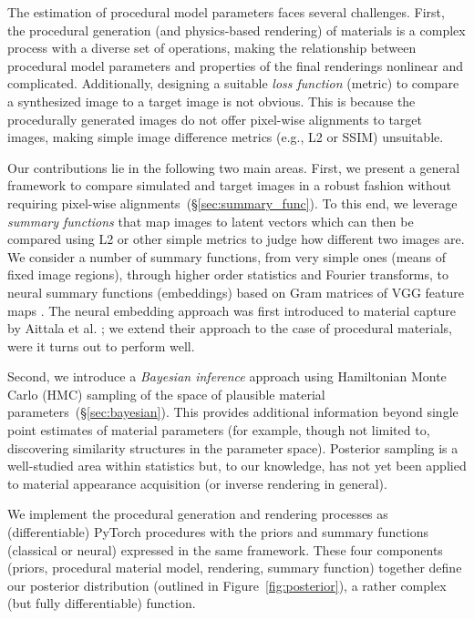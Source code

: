 The estimation of procedural model parameters faces several challenges. First, the procedural generation (and physics-based rendering) of materials is a complex process with a diverse set of operations, making the relationship between procedural model parameters and properties of the final renderings nonlinear and complicated.
Additionally, designing a suitable \emph{loss function} (metric) to compare a synthesized image to a target image is not obvious.
This is because the procedurally generated images do not offer pixel-wise alignments to target images, making simple image difference metrics (e.g., L2 or SSIM) unsuitable.

Our contributions lie in the following two main areas. First, we present a general framework to %
compare simulated and target images in a robust fashion without requiring pixel-wise alignments~(\S\ref{sec:summary_func}). To this end, we leverage \emph{summary functions} that map images to latent vectors which can then be compared using L2 or other simple metrics to judge how different two images are.
We consider a number of summary functions, from very simple ones (means of fixed image regions), through higher order statistics and Fourier transforms, to neural summary functions (embeddings) based on Gram matrices of VGG feature maps \cite{Gatys2015,Gatys2016}. The neural embedding approach was first introduced to material capture by Aittala et al. \cite{Aittala2016}; we extend their approach to the case of procedural materials, were it turns out to perform well.

Second, we introduce a \emph{Bayesian inference} approach using Hamiltonian Monte Carlo (HMC) sampling of the space of plausible material parameters~(\S\ref{sec:bayesian}). This provides additional information beyond single point estimates of material parameters (for example, though not limited to, discovering similarity structures in the parameter space). Posterior sampling is a well-studied area within statistics but, to our knowledge, has not yet been applied to material appearance acquisition (or inverse rendering in general).

We implement the procedural generation and rendering processes as (differentiable) PyTorch procedures with the priors and summary functions (classical or neural) expressed in the same framework. These four components (priors, procedural material model, rendering, summary function) together define our posterior distribution (outlined in Figure~\ref{fig:posterior}), a rather complex (but fully differentiable) function.

